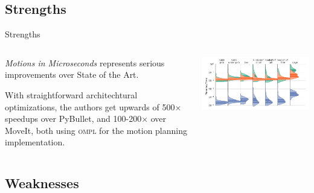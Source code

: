 \documentclass{beamer}
\begin{document}
\subsection{Strengths}

\begin{frame}{Strengths}
\begin{columns}
\begin{column}{0.5\textwidth}
\textit{Motions in Microseconds} represents serious improvements over State of the Art.
\vspace{10px}

With straightforward architechtural optimizations, the authors get upwards of 500$\times$ speedups over PyBullet, and 100-200$\times$ over MoveIt, both using \textsc{ompl} for the motion planning implementation.
\end{column}
\begin{column}{0.5\textwidth}
\includegraphics[width=\textwidth]{./assets/panda_graphs.png}
\end{column}
\end{columns}

\end{frame}

\subsection{Weaknesses}
\end{document}
